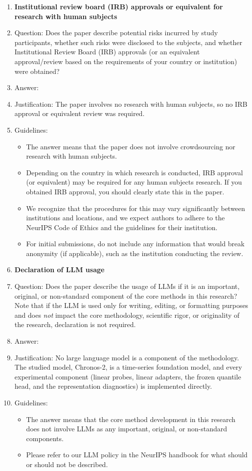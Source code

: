 \begin{enumerate}
\item {\bf Institutional review board (IRB) approvals or equivalent for research with human subjects}
    \item[] Question: Does the paper describe potential risks incurred by study participants, whether such risks were disclosed to the subjects, and whether Institutional Review Board (IRB) approvals (or an equivalent approval/review based on the requirements of your country or institution) were obtained?
    \item[] Answer: \answerNA{}
    \item[] Justification: The paper involves no research with human subjects, so no IRB approval or equivalent review was required.
    \item[] Guidelines:
    \begin{itemize}
        \item The answer \answerNA{} means that the paper does not involve crowdsourcing nor research with human subjects.
        \item Depending on the country in which research is conducted, IRB approval (or equivalent) may be required for any human subjects research. If you obtained IRB approval, you should clearly state this in the paper. 
        \item We recognize that the procedures for this may vary significantly between institutions and locations, and we expect authors to adhere to the NeurIPS Code of Ethics and the guidelines for their institution. 
        \item For initial submissions, do not include any information that would break anonymity (if applicable), such as the institution conducting the review.
    \end{itemize}

\item {\bf Declaration of LLM usage}
    \item[] Question: Does the paper describe the usage of LLMs if it is an important, original, or non-standard component of the core methods in this research? Note that if the LLM is used only for writing, editing, or formatting purposes and does \emph{not} impact the core methodology, scientific rigor, or originality of the research, declaration is not required.
    \item[] Answer: \answerNA{}
    \item[] Justification: No large language model is a component of the methodology. The studied model, Chronos-2, is a time-series foundation model, and every experimental component (linear probes, linear adapters, the frozen quantile head, and the representation diagnostics) is implemented directly.
    \item[] Guidelines:
    \begin{itemize}
        \item The answer \answerNA{} means that the core method development in this research does not involve LLMs as any important, original, or non-standard components.
        \item Please refer to our LLM policy in the NeurIPS handbook for what should or should not be described.
    \end{itemize}

\end{enumerate}